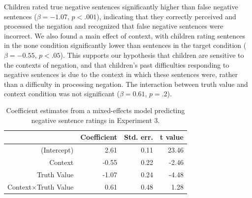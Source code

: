 \documentclass[man, noapacite]{apa2}
\begin{document}
Children rated true negative sentences significantly higher than false negative sentences ($\beta= -1.07$, $p< .001$), indicating that they correctly perceived and processed the negation and recognized that false negative sentences were incorrect. We also found a main effect of context, with children rating sentences in the none condition significantly lower than sentences in the target condition ($\beta= -0.55$, $p< .05$). This supports our hypothesis that children are sensitive to the contexts of negation, and that children's past difficulties responding to negative sentences is due to the context in which these sentences were, rather than a difficulty in processing negation. The interaction between truth value and context condition was not significant ($\beta= 0.61$, $p=.2$).

\begin{table}[t]
\caption{\label{tab:s3.1} Coefficient estimates from a mixed-effects model predicting negative sentence ratings in Experiment 3.}
\begin{center}
\small\addtolength{\tabcolsep}{-5pt}
\begin{tabular}{rrrr}
 \hline
 & Coefficient & Std. err. & t value \\
 \hline
(Intercept) & 2.61 & 0.11 & 23.46 \\
 Context & -0.55 & 0.22 & -2.46 \\
 Truth Value & -1.07 & 0.24 & -4.48 \\
 Context$\times$Truth Value & 0.61 & 0.48 & 1.28 \\
 \hline
\end{tabular}
\end{center}
\end{table}

\end{document}
